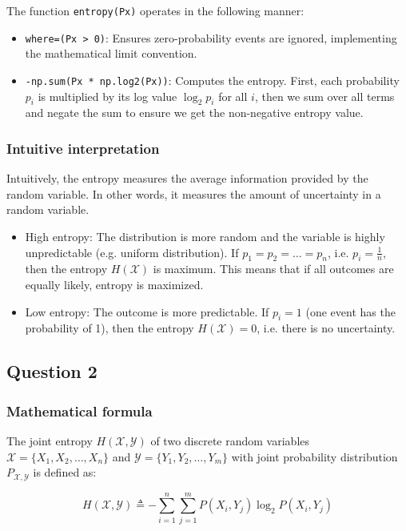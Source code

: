 \documentclass{article}
\begin{document}
The function \texttt{entropy(Px)} operates in the following manner:

\begin{itemize}
    \item \texttt{where=(Px > 0)}: Ensures zero-probability events are ignored, implementing the mathematical limit convention.
    \item \texttt{-np.sum(Px * np.log2(Px))}: Computes the entropy. First, each probability $p_i$ is multiplied by its log value $\log_2 p_i$ for all $i$, then we sum over all terms and negate the sum to ensure we get the non-negative entropy value.
\end{itemize}

\subsubsection*{Intuitive interpretation}

Intuitively, the entropy measures the average information provided by the random variable. In other words, it measures the amount of uncertainty in a random variable.
\begin{itemize}
    \item High entropy: The distribution is more random and the variable is highly unpredictable (e.g. uniform distribution). If $p_1 = p_2 = \ldots = p_n$, i.e. $p_i = \frac{1}{n}$, then the entropy $H(\mathcal{X})$ is maximum. This means that if all outcomes are equally likely, entropy is maximized.
    \item Low entropy: The outcome is more predictable. If $p_i = 1$ (one event has the probability of 1), then the entropy $H(\mathcal{X}) = 0$, i.e. there is no uncertainty.
\end{itemize}

\subsection{Question 2}

\subsubsection*{Mathematical formula}
The joint entropy $H(\mathcal{X},\mathcal{Y})$ of two discrete random variables $\mathcal{X} = \{X_1, X_2, \ldots, X_n\}$ and $\mathcal{Y} = \{Y_1, Y_2, \ldots, Y_m\}$ with joint probability distribution $P_{\mathcal{X},\mathcal{Y}}$ is defined as:

\begin{equation}
H(\mathcal{X},\mathcal{Y}) \triangleq - \sum_{i=1}^{n} \sum_{j=1}^{m} P(X_i, Y_j) \log_2 P(X_i, Y_j)
\end{equation}
\end{document}
